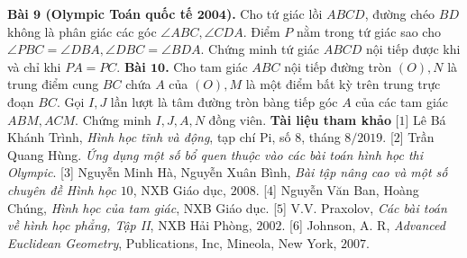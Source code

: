 \begin{multicols}{2}
	\vskip 0.1cm
	\textbf{\color{diendantoanhoc}Bài $\pmb{9}$ (Olympic Toán quốc tế $\pmb{2004}$).} Cho tứ giác lồi $ABCD$, đường chéo $BD$ không là phân giác các góc  $\angle ABC, \angle CDA$. Điểm $P$ nằm trong tứ giác sao cho  $\angle PBC = \angle DBA, \angle DBC = \angle BDA$. Chứng minh tứ giác $ABCD$ nội tiếp được khi và chỉ khi $PA=PC$.
	\vskip 0.1cm
	\textbf{\color{diendantoanhoc}Bài $\pmb{10}$.} Cho tam giác $ABC$ nội tiếp đường tròn $(O),N$ là trung điểm cung $BC$ chứa $A$ của $(O), M$ là một điểm bất kỳ trên trung trực đoạn $BC$. Gọi $I,J$ lần lượt là tâm đường tròn bàng tiếp góc $A$ của các tam giác $ABM,ACM$. Chứng minh $I,J,A,N$ đồng viên.
	\vskip 0.1cm
	\textbf{\color{diendantoanhoc}Tài liệu tham khảo}
	\vskip 0.1cm
	[$1$] Lê Bá Khánh Trình, \textit{Hình học tĩnh và động}, tạp chí Pi, số $8$, tháng $8/2019$. 
	\vskip 0.1cm
	[$2$] Trần Quang Hùng. \textit{Ứng dụng một số bổ quen thuộc vào các bài toán hình học thi Olympic}.
	\vskip 0.1cm
	[$3$] Nguyễn Minh Hà, Nguyễn Xuân Bình, \textit{Bài tập nâng cao và một số chuyên đề Hình học $10$}, NXB Giáo dục, $2008$.
	\vskip 0.1cm
	[$4$] Nguyễn Văn Ban, Hoàng Chúng, \textit{Hình học của tam giác}, NXB Giáo dục.
	\vskip 0.1cm
	[$5$] V.V. Praxolov, \textit{Các bài toán về hình học phẳng, Tập II}, NXB Hải Phòng, $2002$.
	\vskip 0.1cm
	[$6$] Johnson, A. R, \textit{Advanced Euclidean Geometry}, Publications, Inc, Mineola, New York, $2007$.
\end{multicols}